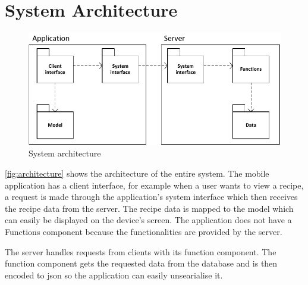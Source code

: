 \section{System Architecture}

\begin{figure}[H]
\centering
\includegraphics[width=0.9\linewidth]{img/components.pdf}
\caption{System architecture}
\label{fig:architecture}
\end{figure}

\autoref{fig:architecture} shows the architecture of the entire system. The mobile application has a client interface, for example when a user wants to view a recipe, a request is made through the application's system interface which then receives the recipe data from the server. The recipe data is mapped to the model which can easily be displayed on the device's screen. The application does not have a Functions component because the functionalities are provided by the server.

The server handles requests from clients with its function component. The function component gets the requested data from the database and is then encoded to \ac{json} so the application can easily unsearialise it.